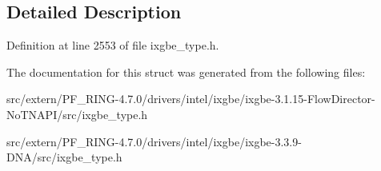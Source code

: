 \subsection{Detailed Description}


Definition at line 2553 of file ixgbe\_\-type.h.



The documentation for this struct was generated from the following files:\begin{DoxyCompactItemize}
\item 
src/extern/PF\_\-RING-\/4.7.0/drivers/intel/ixgbe/ixgbe-\/3.1.15-\/FlowDirector-\/NoTNAPI/src/ixgbe\_\-type.h\item 
src/extern/PF\_\-RING-\/4.7.0/drivers/intel/ixgbe/ixgbe-\/3.3.9-\/DNA/src/ixgbe\_\-type.h\end{DoxyCompactItemize}
